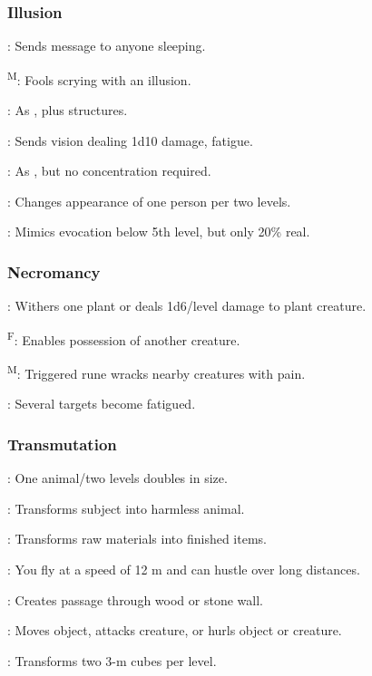 \subsubsection{Illusion}
	: Sends message to anyone sleeping.

	\textsuperscript{M}: Fools scrying with an illusion.

	: As , plus structures.

	: Sends vision dealing 1d10 damage, fatigue.

	: As , but no concentration required.

	: Changes appearance of one person per two levels.

	: Mimics evocation below 5th level, but only 20\% real.

\subsubsection{Necromancy}
	: Withers one plant or deals 1d6/level damage to plant creature.

	\textsuperscript{F}: Enables possession of another creature.

	\textsuperscript{M}: Triggered rune wracks nearby creatures with pain.

	: Several targets become fatigued.

\subsubsection{Transmutation}
	: One animal/two levels doubles in size.

	: Transforms subject into harmless animal.

	: Transforms raw materials into finished items.

	: You fly at a speed of 12 m and can hustle over long distances.

	: Creates passage through wood or stone wall.

	: Moves object, attacks creature, or hurls object or creature.

	: Transforms two 3-m cubes per level.

